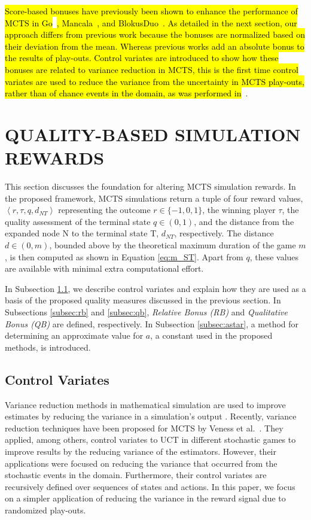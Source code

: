 \documentclass{ecai2014}
\newcommand{\tuple}[1]{\ensuremath{\left \langle #1 \right \rangle }}
\newcommand{\node}[1]{{\fontfamily{phv}\selectfont#1}}
\begin{document}
\hl{Score-based bonuses have previously been shown to enhance the performance of MCTS in Go}~{\cite{Enzenberger10Fuego,xie2009backpropagation}}\hl{, Mancala~{\cite{Ramanujan}}, and BlokusDuo~{\cite{shibahara2008combining}}. As detailed in the next section, our approach differs from previous work because the bonuses are normalized based on their deviation from the mean. Whereas previous works add an absolute bonus to the results of play-outs. Control variates are introduced to show how these bonuses are related to variance reduction in MCTS, this is the first time control variates are used to reduce the variance from the uncertainty in MCTS play-outs, rather than of chance events in the domain, as was performed in}~{\cite{Veness11variance}}.

\section{QUALITY-BASED SIMULATION REWARDS}
\label{sec:qoreward}
This section discusses the foundation for altering MCTS simulation rewards. In the proposed framework, MCTS simulations return a tuple of four reward values, $\tuple{r,\tau,q,d_{NT}}$ representing the outcome $r\in\{-1, 0, 1\}$, the winning player $\tau$, the quality assessment of the terminal state $q\in(0, 1)$, and the distance from the expanded node \node{N} to the terminal state \node{T}, $d_{NT}$, respectively. The distance $d\in(0, m)$, bounded above by the theoretical maximum duration of the game $m$, is then computed as shown in Equation \ref{eq:m_ST}. Apart from $q$, these values are available with minimal extra computational effort.

In Subsection \ref{sub:cv}, we describe control variates and explain how they are used as a basis of the proposed quality measures discussed in the previous section. In Subsections \ref{subsec:rb} and \ref{subsec:qb}, \emph{Relative Bonus (RB)} and \emph{Qualitative Bonus (QB)} are defined, respectively. In Subsection \ref{subsec:astar}, a method for determining an approximate value for $a$, a constant used in the proposed methods, is introduced.

\subsection{Control Variates}
\label{sub:cv}
Variance reduction methods in mathematical simulation are used to improve estimates by reducing the variance in a simulation's output \cite{kelton2000simulation}. Recently, variance reduction techniques have been proposed for MCTS by Veness et al.~\cite{Veness11variance}. They applied, among others, control variates to UCT in different stochastic games to improve results by the reducing variance of the estimators. However, their applications were focused on reducing the variance that occurred from the stochastic events in the domain. Furthermore, their control variates are recursively defined over sequences of states and actions. In this paper, we focus on a simpler application of reducing the variance in the reward signal due to randomized play-outs.  
\end{document}
